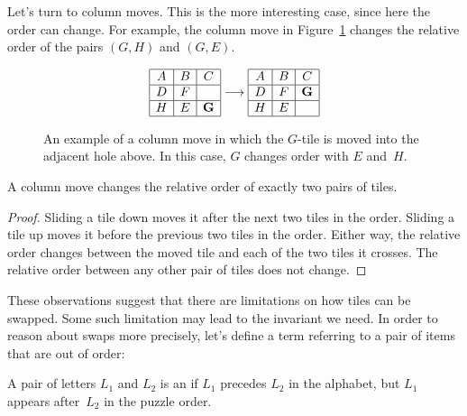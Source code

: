 Let's turn to column moves.  This is the more interesting case, since
here the order can change.  For example, the column move in
Figure~\ref{fig:8columnmove} changes the relative order of the pairs
$(G, H)$ and $(G, E)$.

\begin{figure}
\begin{equation*}
\begin{array}{|c|c|c|}
\hline
A & B & C \\ \hline
D & F &  \\ \hline
H & E & \mathbf{G} \\ \hline
\end{array}
\longrightarrow
\begin{array}{|c|c|c|}
\hline
A & B & C \\ \hline
D & F & \mathbf{G} \\ \hline
H & E &  \\ \hline
\end{array}
\end{equation*}
\caption{An example of a column move in which the $G$-tile is moved
  into the adjacent hole above.  In this case, $G$ changes order with
  $E$ and~$H$.}
\label{fig:8columnmove}
\end{figure}

\begin{lemma}\label{lem:8puzzleB}
A column move  changes the relative order of exactly two pairs of
tiles.
\end{lemma}

\begin{proof}
Sliding a tile down moves it after the next two tiles in the order.
Sliding a tile up moves it before the previous two tiles in the
order.  Either way, the relative order changes between the moved tile
and each of the two tiles it crosses.  The relative order between any other
pair of tiles does not change.
\end{proof}

These observations suggest that there are limitations on how tiles can
be swapped.  Some such limitation may lead to the invariant we need.
In order to reason about swaps more precisely, let's define a term
referring to a pair of items that are out of order:
\begin{definition}\label{def:8inversion}
A pair of letters $L_1$ and $L_2$ is an  if $L_1$
precedes $L_2$ in the alphabet, but $L_1$ appears after~$L_2$ in the
puzzle order.
\end{definition}

